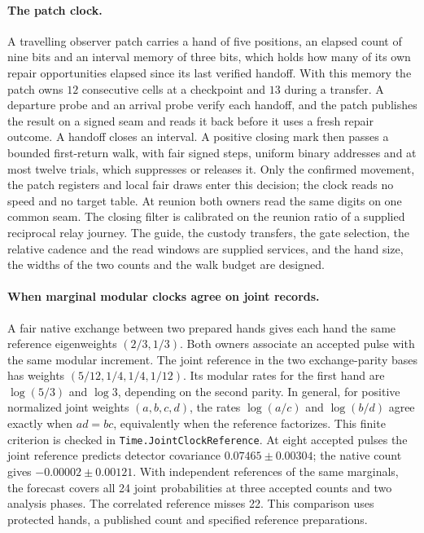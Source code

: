 \documentclass[11pt]{article}
\theoremstyle{definition}
\theoremstyle{remark}
\theoremstyle{plain}
\begin{document}
\paragraph{The patch clock.}
A travelling observer patch carries a hand of five positions, an elapsed
count of nine bits and an interval memory of three bits, which holds how
many of its own repair opportunities elapsed since its last verified
handoff. With this memory the patch owns $12$ consecutive cells at a
checkpoint and $13$ during a transfer. A departure probe and an arrival
probe verify each handoff, and the patch publishes the result on a signed
seam and reads it back before it uses a fresh repair outcome. A handoff
closes an interval. A positive closing mark then passes a bounded
first-return walk, with fair signed steps, uniform binary addresses and at
most twelve trials, which suppresses or releases it. Only the confirmed
movement, the patch registers and local fair draws enter this decision; the
clock reads no speed and no target table. At reunion both owners read the
same digits on one common seam. The closing filter is calibrated on the
reunion ratio of a supplied reciprocal relay journey. The guide, the
custody transfers, the gate selection, the relative cadence and the read
windows are supplied services, and the hand size, the widths of the two
counts and the walk budget are designed.

\paragraph{When marginal modular clocks agree on joint records.}
A fair native exchange between two prepared hands gives each hand
the same reference eigenweights $(2/3,1/3)$. Both owners associate
an accepted pulse with the same modular increment. The joint
reference in the two exchange-parity bases has weights
$(5/12,1/4,1/4,1/12)$. Its modular rates for the first hand are
$\log(5/3)$ and $\log 3$, depending on the second parity. In general,
for positive normalized joint weights $(a,b,c,d)$, the rates
$\log(a/c)$ and $\log(b/d)$ agree exactly when $ad=bc$, equivalently
when the reference factorizes. This finite criterion is checked in
\texttt{Time.JointClockReference}. At eight accepted pulses the
joint reference predicts detector covariance $0.07465\pm0.00304$;
the native count gives $-0.00002\pm0.00121$. With independent
references of the same marginals, the forecast covers all 24 joint
probabilities at three accepted counts and two analysis phases.
The correlated reference misses 22. This comparison uses protected
hands, a published count and specified reference preparations.
\end{document}
